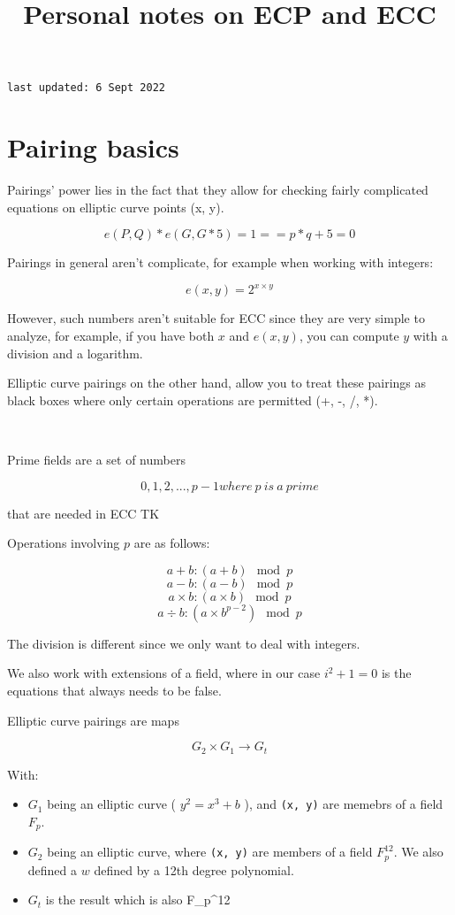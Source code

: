 \documentclass{article}
\title{Personal notes on ECP and ECC}
\newcommand{\inl}[1]{\lstinline{#1}}
\begin{document}
\maketitle

\inl{last updated: 6 Sept 2022}

\section{Pairing basics}

Pairings' power lies in the fact that they allow for checking fairly complicated equations on elliptic curve points (x, y).

\[e (P, Q) * e (G, G * 5) = 1 == p * q + 5 = 0 \]

Pairings in general aren't complicate, for example when working with integers:

\[ e (x, y) = 2^{ x \times y } \]

However, such numbers aren't suitable for ECC since they are very simple to analyze, for example, if you have both \( x \) and \( e (x, y) \), you can compute \( y \) with a division and a logarithm.

Elliptic curve pairings on the other hand, allow you to treat these pairings as black boxes where only certain operations are permitted (+, -, /, *).

\

Prime fields are a set of numbers

\[ { 0, 1, 2, ..., p - 1 } where \ p \ is \ a \ prime \]

that are needed in ECC TK

Operations involving \( p \) are as follows:

\[ a + b:  (a + b) \mod p \]
\[ a - b:  (a - b) \mod p \]
\[ a \times b:  (a \times b) \mod p \]
\[ a \div b:  (a \times b^{p-2}) \mod p \]

The division is different since we only want to deal with integers.

We also work with extensions of a field, where in our case \( i ^ 2 + 1 = 0 \) is the equations that always needs to be false.


Elliptic curve pairings are maps

\[ G_2 \times G_1 \rightarrow G_t  \]

With:
\begin{itemize}
\item \( G_1 \) being an elliptic curve ( \( y^2 = x^3 + b \) ), and \inl{(x, y)} are memebrs of a field \( F_p \).
\item \( G_2 \) being an elliptic curve, where \inl{(x, y)} are members of a field \( F_p^{12} \). We also defined a \( w \) defined by a 12th degree polynomial.
\item \( G_t \) is the result which is also F_p^{12}
\end{itemize}
\end{document}

